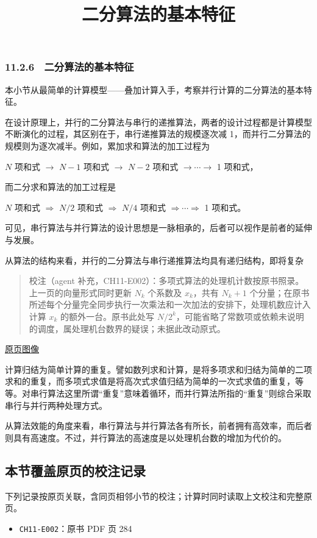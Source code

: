\documentclass[
  10pt,
  fontset=fandol]{ctexart}
\title{二分算法的基本特征}
\author{}
\date{}
\providecommand{\tightlist}{%
  \setlength{\itemsep}{0pt}\setlength{\parskip}{0pt}}
\begin{document}
\maketitle

\subsubsection{11.2.6　二分算法的基本特征}\label{ux4e8cux5206ux7b97ux6cd5ux7684ux57faux672cux7279ux5f81}

本小节从最简单的计算模型------叠加计算入手，考察并行计算的二分算法的基本特征。

在设计原理上，并行的二分算法与串行的递推算法，两者的设计过程都是计算模型不断演化的过程，其区别在于，串行递推算法的规模逐次减 1，而并行二分算法的规模则为逐次减半。例如，累加求和算法的加工过程为

\(N\) 项和式 \(\to\) \(N-1\) 项和式 \(\to\) \(N-2\) 项和式 \(\to\cdots\to\) 1 项和式，

而二分求和算法的加工过程是

\(N\) 项和式 \(\Rightarrow\) \(N/2\) 项和式 \(\Rightarrow\) \(N/4\) 项和式 \(\Rightarrow\cdots\Rightarrow\) 1 项和式。

可见，串行算法与并行算法的设计思想是一脉相承的，后者可以视作是前者的延伸与发展。

从算法的结构来看，并行的二分算法与串行递推算法均具有递归结构，即将复杂

\begin{quote}
校注（agent 补充，CH11-E002）：多项式算法的处理机计数按原书照录。上一页的向量形式同时更新 \(N_k\) 个系数及 \(x_k\)，共有 \(N_k+1\) 个分量；在原书所述每个分量完全同步执行一次乘法和一次加法的安排下，处理机数应计入计算 \(x_k\) 的额外一台。原书此处写 \(N/2^k\)，可能省略了常数项或依赖未说明的调度，属处理机台数界的疑误；未据此改动原式。
\end{quote}

\href{../../source-images/pdf-285.jpeg}{原页图像}

计算归结为简单计算的重复。譬如数列求和计算，是将多项求和归结为简单的二项求和的重复，而多项式求值是将高次式求值归结为简单的一次式求值的重复，等等。对串行算法这里所谓``重复''意味着循环，而并行算法所指的``重复''则综合采取串行与并行两种处理方式。

从算法效能的角度来看，串行算法与并行算法各有所长，前者拥有高效率，而后者则具有高速度。不过，并行算法的高速度是以处理机台数的增加为代价的。

\subsection{本节覆盖原页的校注记录}\label{ux672cux8282ux8986ux76d6ux539fux9875ux7684ux6821ux6ce8ux8bb0ux5f55}

下列记录按原页关联，含同页相邻小节的校注；计算时同时读取上文校注和完整原页。

\begin{itemize}
\tightlist
\item
  \texttt{CH11-E002}：原书 PDF 页 284
\end{itemize}
\end{document}
